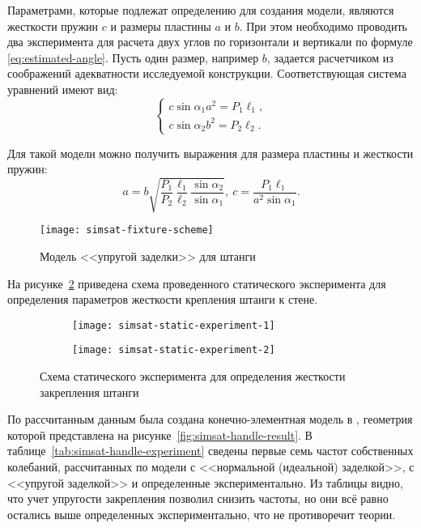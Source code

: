 Параметрами, которые подлежат определению для создания модели, являются жесткости пружин $ c $ и размеры пластины $ a $ и $ b $. При этом необходимо проводить два эксперимента для расчета двух углов по горизонтали и вертикали по формуле \eqref{eq:estimated-angle}. Пусть один размер, например $ b $, задается расчетчиком из соображений адекватности исследуемой конструкции. Соответствующая система уравнений имеют вид:
\begin{equation}
	\begin{cases}
		c \sin \alpha_1 a ^ 2 = P_1 \ell_1, \\
		c \sin \alpha_2 b ^ 2 = P_2 \ell_2.
	\end{cases}
\end{equation}

Для такой модели можно получить выражения для размера пластины  и жесткости пружин:
\begin{equation}
	a = b \sqrt{\frac{P_1}{P_2} \frac{\ell_1}{\ell_2} \frac{\sin \alpha_2}{\sin \alpha_1}}, \ c = \frac{P_1 \ell_1}{a ^ 2 \sin \alpha_1}.
\end{equation}

\begin{figure}[!htb]
	\centering
	\texttt{[image: simsat-fixture-scheme]}
	\caption{Модель <<упругой заделки>> для штанги} \label{fig:simsat-fixture-scheme}
\end{figure}

На рисунке~\ref{fig:simsat-static-experiment} приведена схема проведенного статического эксперимента для определения параметров жесткости крепления штанги к стене.

\begin{figure}[!htb]
	\centering
	\begin{subfigure}[b]{0.49\textwidth}
		\centering
		\texttt{[image: simsat-static-experiment-1]}
	\end{subfigure}
	\hfill
	\begin{subfigure}[b]{0.5\textwidth}
		\centering
		\texttt{[image: simsat-static-experiment-2]}
	\end{subfigure}	
	\caption{Схема статического эксперимента для определения жесткости закрепления штанги} \label{fig:simsat-static-experiment}
\end{figure}

По рассчитанным данным была создана конечно-элементная модель в , геометрия которой представлена на рисунке~\ref{fig:simsat-handle-result}. В таблице~\ref{tab:simsat-handle-experiment} сведены первые семь частот собственных колебаний, рассчитанных по модели с <<нормальной (идеальной) заделкой>>, с <<упругой заделкой>> и определенные экспериментально. Из таблицы видно, что учет упругости закрепления позволил снизить частоты, но они всё равно остались выше определенных экспериментально, что не противоречит теории.

